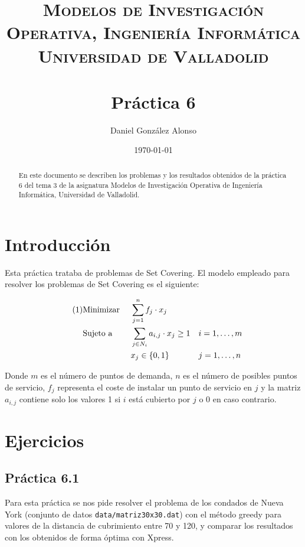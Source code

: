 \documentclass[a4paper,11pt]{article}
\title{
	\vspace{-25pt}
	\normalfont \Large \textsc{
		Modelos de Investigación Operativa,
        Ingeniería Informática\\
        Universidad de Valladolid
	}\\[10pt]
	\horrule{1pt}\\[10pt]
	\huge \textbf{
		Práctica 6
	}\\
	\horrule{1pt}
}
\author{
	\normalfont \Large Daniel González Alonso
}
\date{
	\normalfont \large \today
}
\newcommand\numberthis{				%
	\addtocounter{equation}{1}\tag{\theequation}
}
\begin{document}
\maketitle

\begin{abstract}
	En este documento se describen los problemas y los resultados obtenidos de la práctica 6 del tema 3 de la asignatura Modelos de Investigación Operativa de Ingeniería Informática, Universidad de Valladolid.
\end{abstract}

\section{Introducción}
Esta práctica trataba de problemas de Set Covering. El modelo empleado para resolver los problemas de Set Covering es el siguiente:

\begin{align*}\numberthis
   	&\textrm{Minimizar }	&& \sum_{j=1}^{n}{f_j \cdot x_j} \\
   	&\textrm{Sujeto a }		&& \sum_{j \in N_{i}}{a_{i,j} \cdot x_{j} \geq 1} 	&& i=1,\ldots,m \\
	&						&& x_{j} \in \{0,1\}					&& j=1,\ldots,n
\end{align*}

Donde ${m}$ es el número de puntos de demanda, ${n}$ es el número de posibles puntos de servicio, ${f_j}$ representa el coste de instalar un punto de servicio en ${j}$ y la matriz ${a_{i,j}}$ contiene solo los valores 1 si ${i}$ está cubierto por ${j}$ o 0 en caso contrario.\\

\newpage
\section{Ejercicios}

\subsection{Práctica 6.1}
Para esta práctica se nos pide resolver el problema de los condados de Nueva York (conjunto de datos \texttt{data/matriz30x30.dat}) con el método greedy para valores de la distancia de cubrimiento entre 70 y 120, y comparar los resultados con los obtenidos de forma óptima con Xpress.\\
\end{document}
